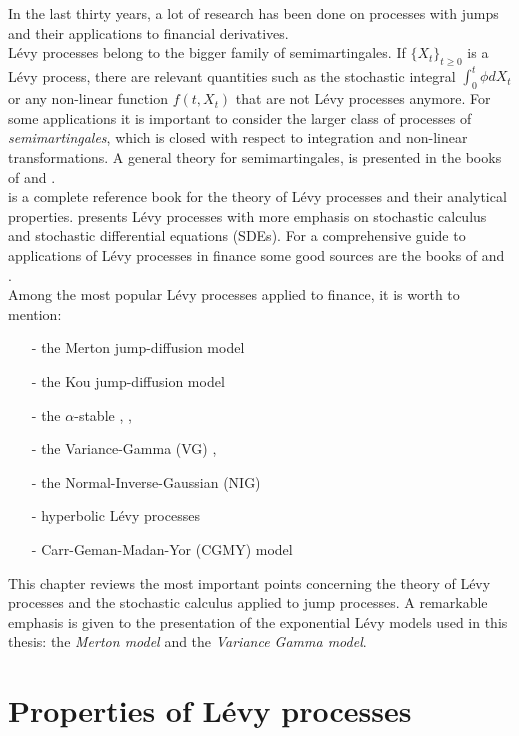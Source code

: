 In the last thirty years, a lot of research has been done on processes with jumps and their applications to financial derivatives.\\
Lévy processes belong to the bigger family of semimartingales.
If $\{X_t\}_{t \ge 0}$ is a Lévy process, there are relevant quantities such as the stochastic integral $\int_0^t \phi dX_t$ or any non-linear function
$f(t,X_t)$ that are not Lévy processes anymore. For some applications it is important to consider the larger class of processes of \emph{semimartingales}, which is closed
with respect to integration and non-linear transformations.
A general theory for semimartingales, is presented in the books 
of \cite{Protter} and \cite{JacodShi}.\\
\cite{Sato} is a complete reference book for the theory of Lévy
processes and their analytical properties. 
\cite{Applebaum} presents Lévy processes with more emphasis on stochastic calculus and stochastic differential equations (SDEs).
For a comprehensive guide to applications of Lévy processes in finance some good sources are the books of 
\cite{Cont} and \cite{Schoutens}.\\ 
Among the most popular Lévy processes applied to finance, it is worth to mention:
\begin{itemize}
 \item[-] the Merton jump-diffusion model \cite{Me76}
 \item[-] the Kou jump-diffusion model \cite{Kou02}
 \item[-] the $\alpha$-stable \cite{Ma63}, \cite{BoPoCo97}, \cite{alpha09}
 \item[-] the Variance-Gamma (VG) \cite{MaSe90}, \cite{MCC98}
 \item[-] the Normal-Inverse-Gaussian (NIG) \cite{BN98}
 \item[-] hyperbolic Lévy processes \cite{EbKe95}
 \item[-] Carr-Geman-Madan-Yor (CGMY) model \cite{CGMY02}
\end{itemize}
This chapter reviews the most important points concerning the theory of Lévy processes and the stochastic calculus applied to jump processes.
A remarkable emphasis is given to the presentation of the exponential Lévy models used in this thesis: 
the \emph{Merton model} and the \emph{Variance Gamma model}.

\section{Properties of Lévy processes}

